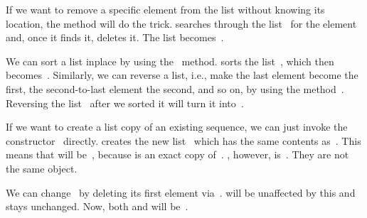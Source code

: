 If we want to remove a specific element from the list without knowing its location, the  method will do the trick.
 searches through the list~ for the element~ and, once it finds it, deletes it.
The list becomes~\pythonil{[1, 7, 12, 2, 4]}.

We can sort a list inplace by using the~ method.
 sorts the list~, which then becomes~\pythonil{[1, 2, 4, 7, 12]}.
Similarly, we can reverse a list, i.e., make the last element become the first, the second-to-last element the second, and so on, by using the method~.
Reversing the list~ after we sorted it will turn it into~\pythonil{[12, 7, 4, 2, 1]}.

If we want to create a list copy of an existing sequence, we can just invoke the constructor~ directly.
 creates the new list~ which has the same contents as~.
This means that  will be~, because  is an exact copy of~.
, however, is~.
They are not the same object.

We can change~ by deleting its first element via~.
 will be unaffected by this and stays unchanged.
Now, both  and  will be~.%
%
\endhsection%
%
